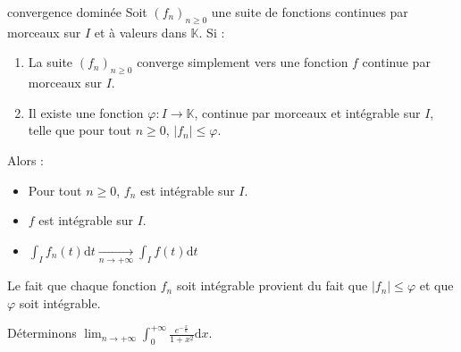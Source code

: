 \documentclass[french,11pt,twoside]{VcCours}
\newcommand{\dx}{\text{d}x}
\newcommand{\dt}{\text{d}t}
\begin{document}
\begin{Theoreme}{convergence dominée}
Soit $(f_n)_{n \geq 0}$ une suite de fonctions continues par morceaux sur $I$ 
et à valeurs dans $\mathbb{K}$. Si :
\begin{enumerate}
\item La suite $(f_n)_{n \geq 0}$ converge simplement vers une fonction $f$ continue par morceaux sur $I$.
\item Il existe une fonction $\varphi : I \rightarrow \mathbb{K}$, continue par morceaux et intégrable sur $I$, telle que pour tout $n \geq 0$, $\vert f_n \vert \leq \varphi$.
\end{enumerate}
Alors :
\begin{itemize}
\item Pour tout $n \geq 0$, $f_n$ est intégrable sur $I$.
\item $f$ est intégrable sur $I$.
\item $\int_{I} f_n(t) \dt \underset{n \rightarrow + \infty}{ \longrightarrow} \int_{I} f(t) \dt$
\end{itemize}
\end{Theoreme}

\begin{Remarque}{} Le fait que chaque fonction $f_n$ soit intégrable provient du fait que $\vert f_n \vert \leq \varphi$ et que $\varphi$ soit intégrable.
\end{Remarque}

\begin{Exemple} Déterminons $\lim_{n \rightarrow + \infty} \int_{0}^{+ \infty} \frac{e^{- \frac{x}{n}}}{1+x^2} \dx$.

%
%

\vspace{11.5cm}
\end{Exemple}
\end{document}
